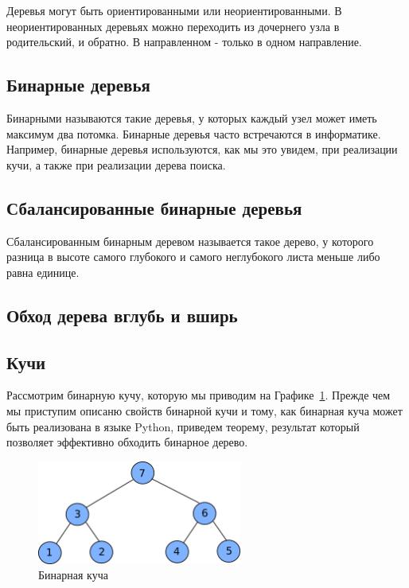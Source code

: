 Деревья могут быть ориентированными или неориентированными. В неориентированных
деревьях можно переходить из дочернего узла в родительский, и обратно. В направленном - 
только в одном направление.

\subsection{Бинарные деревья}

Бинарными называются такие деревья, у которых каждый узел может иметь 
максимум два потомка. Бинарные деревья часто встречаются в информатике.
Например, бинарные деревья используются, как мы это увидем, при реализации
кучи, а также при реализации дерева поиска. 

\subsection{Сбалансированные бинарные деревья}

\begin{definition}
Сбалансированным бинарным деревом называется такое дерево, у которого
разница в высоте самого глубокого и самого неглубокого листа меньше либо равна 
единице.
\end{definition}

\subsection{Обход дерева вглубь и вширь}

\subsection{Кучи}

Рассмотрим бинарную кучу, которую мы приводим на Графике~\ref{fig:binary_heap}.  
Прежде чем мы приступим описаню свойств бинарной кучи и тому, как бинарная куча может быть реализована в 
языке Python, приведем теорему, результат который позволяет эффективно обходить бинарное дерево. 

\begin{figure}
\centering
\includegraphics[width=0.6\textwidth]{graphics/binary_heap.png}
\caption{Бинарная куча}
\label{fig:binary_heap}
\end{figure}

